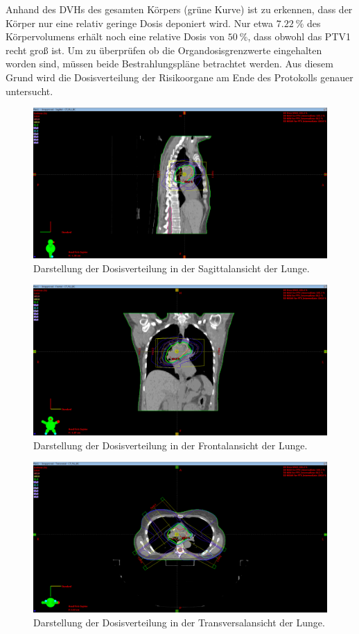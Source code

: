 Anhand des DVHs des gesamten Körpers (grüne Kurve) ist zu erkennen, dass der Körper nur eine relativ geringe Dosis deponiert wird. Nur etwa $\SI{7,22}{\percent}$ des Körpervolumens erhält noch eine relative Dosis von $\SI{50}{\percent}$, dass obwohl das PTV1 recht groß ist. Um zu überprüfen ob die Organdosisgrenzwerte eingehalten worden sind, müssen beide Bestrahlungspläne betrachtet werden. Aus diesem Grund wird die Dosisverteilung der Risikoorgane am Ende des Protokolls genauer untersucht.

\begin{figure}
	\centering
	\includegraphics[width=0.9\linewidth]{../../Bilder/Lunge1_X}
	\caption{Darstellung der Dosisverteilung in der Sagittalansicht der Lunge.}
	\label{fig:lunge1x}
\end{figure}

\begin{figure}
	\centering
	\includegraphics[width=0.9\linewidth]{../../Bilder/Lunge1_Y}
	\caption{Darstellung der Dosisverteilung in der Frontalansicht  der Lunge.}
	\label{fig:lunge1y}
\end{figure}

\begin{figure}
	\centering
	\includegraphics[width=0.9\linewidth]{../../Bilder/Lunge1_Z}
	\caption{Darstellung der Dosisverteilung in der Transversalansicht  der Lunge.}
	\label{fig:lunge1z}
\end{figure}

